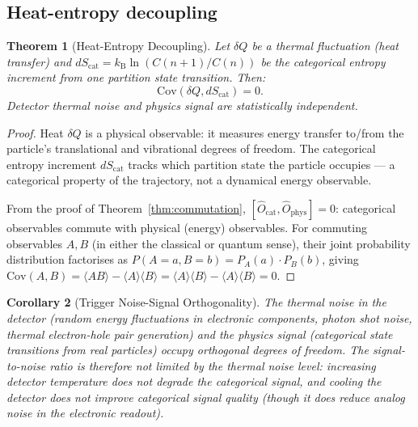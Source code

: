 \documentclass[twocolumn,10pt,a4paper]{article}
\theoremstyle{thmstyle}
\newtheorem{theorem}{Theorem}[section]
\newtheorem{corollary}[theorem]{Corollary}
\theoremstyle{definition}
\theoremstyle{remark}
\newcommand{\kB}{k_{\mathrm{B}}}
\newcommand{\Ocat}{\hat{O}_{\mathrm{cat}}}
\newcommand{\Ophys}{\hat{O}_{\mathrm{phys}}}
\begin{document}
\subsection{Heat-entropy decoupling}

\begin{theorem}[Heat-Entropy Decoupling]
\label{thm:heat_entropy}
Let $\delta Q$ be a thermal fluctuation (heat transfer) and
$dS_{\mathrm{cat}} = \kB\ln(C(n+1)/C(n))$ be the categorical entropy
increment from one partition state transition. Then:
\begin{equation}
\mathrm{Cov}(\delta Q, dS_{\mathrm{cat}}) = 0.
\label{eq:decoupling}
\end{equation}
Detector thermal noise and physics signal are statistically independent.
\end{theorem}

\begin{proof}
Heat $\delta Q$ is a physical observable: it measures energy transfer
to/from the particle's translational and vibrational degrees of freedom.
The categorical entropy increment $dS_{\mathrm{cat}}$ tracks which partition
state the particle occupies — a categorical property of the trajectory,
not a dynamical energy observable.

From the proof of Theorem~\ref{thm:commutation}, $[\Ocat, \Ophys] = 0$:
categorical observables commute with physical (energy) observables.
For commuting observables $A, B$ (in either the classical or quantum sense),
their joint probability distribution factorises as
$P(A=a, B=b) = P_A(a) \cdot P_B(b)$, giving
$\mathrm{Cov}(A,B) = \langle AB\rangle - \langle A\rangle\langle B\rangle
= \langle A\rangle\langle B\rangle - \langle A\rangle\langle B\rangle = 0$.
\end{proof}

\begin{corollary}[Trigger Noise-Signal Orthogonality]
\label{cor:orthogonality}
The thermal noise in the detector (random energy fluctuations in electronic
components, photon shot noise, thermal electron-hole pair generation)
and the physics signal (categorical state transitions from real particles)
occupy orthogonal degrees of freedom. The signal-to-noise ratio is therefore
not limited by the thermal noise level: increasing detector temperature
does not degrade the categorical signal, and cooling the detector does not
improve categorical signal quality (though it does reduce analog noise
in the electronic readout).
\end{corollary}
\end{document}
